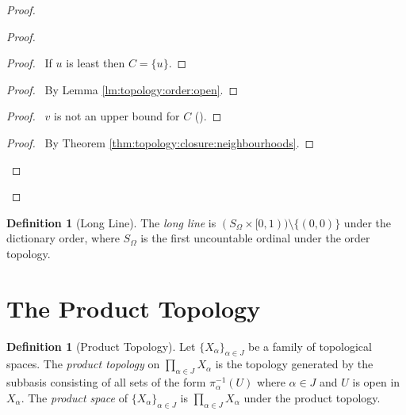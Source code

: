 \documentclass{report}
\let\qed\relax
\theoremstyle{definition}
\newtheorem{df}[lm]{Definition}
\begin{document}
  \begin{proof}
    \pf
    \begin{proof}
      \begin{proof}
        \pf\ If $u$ is least then $C = \{ u \}$.
      \end{proof}
      \step{<2>3}{\pick\ $v < u$ such that $(v, u] \subseteq U$}
      \begin{proof}
        \pf\ By Lemma \ref{lm:topology:order:open}.
      \end{proof}
      \begin{proof}
        \pf\ $v$ is not an upper bound for $C$ ().
      \end{proof}
      \qedstep
      \begin{proof}
        \pf\ By Theorem \ref{thm:topology:closure:neighbourhoods}.
      \end{proof}
    \end{proof}
    \qed
  \end{proof}

  \begin{df}[Long Line]
    The \emph{long line} is $(S_\Omega \times [0, 1)) \setminus \{(0, 0)\}$
    under the dictionary
    order, where $S_\Omega$ is the first uncountable ordinal under the order
    topology.
  \end{df}

  \section{The Product Topology}

  \begin{df}[Product Topology]
    Let $\{ X_\alpha \}_{\alpha \in J}$ be a family of topological spaces. The
    \emph{product topology} on $\prod_{\alpha \in J} X_\alpha$ is the topology
    generated by the subbasis consisting of all sets of the form
    $\pi_\alpha^{-1}(U)$ where $\alpha \in J$ and $U$ is open in $X_\alpha$.
    The \emph{product space} of $\{ X_\alpha \}_{\alpha \in J}$ is
    $\prod_{\alpha \in J} X_\alpha$ under the product topology.
  \end{df}
\end{document}
